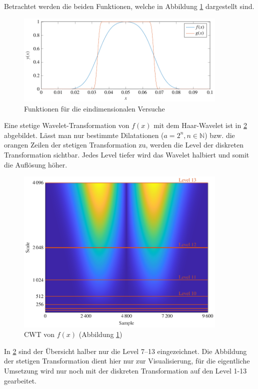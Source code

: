 Betrachtet werden die beiden Funktionen, welche in Abbildung \ref{deconvolve:1d} dargestellt sind.
\begin{figure}
\centering
\includegraphics[width=0.9\textwidth]{./papers/deconvolve/pictures/1d.pdf}
\caption{Funktionen für die eindimensionalen Versuche\label{deconvolve:1d}}
\end{figure}
Eine stetige Wavelet-Transformation von $f(x)$ mit dem Haar-Wavelet ist in \ref{deconvolve:y1_cwt} abgebildet.
Lässt man nur bestimmte Dilatationen ($a=2^n, n\in \mathbb{N}$) bzw. die orangen \glqq Zeilen\grqq{} der stetigen Transformation zu, werden die Level der diskreten Transformation sichtbar.
Jedes Level tiefer wird das Wavelet \glqq halbiert\grqq{} und somit die Auflösung höher.

\begin{figure}
\centering
\includegraphics[width=0.9\textwidth]{./papers/deconvolve/pictures/y1_cwt.pdf}
\caption{CWT von $f(x)$ (Abbildung \ref{deconvolve:1d})\label{deconvolve:y1_cwt}}
\end{figure}

In \ref{deconvolve:y1_cwt} sind der Übersicht halber nur die Level 7--13 eingezeichnet. 
Die Abbildung der stetigen Transformation dient hier nur zur Visualisierung, für die eigentliche Umsetzung wird nur noch mit der diskreten Transformation auf den Level 1-13 gearbeitet.

